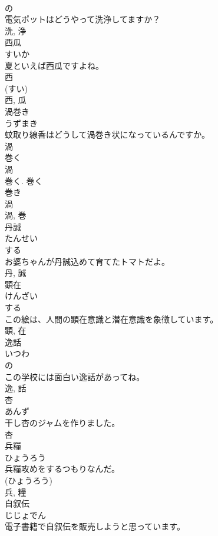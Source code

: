 \documentclass[8pt]{extreport}
\begin{document}
\begin{CJK}{UTF8}{min}
\\	の 
\\	電気ポットはどうやって洗浄してますか？	
\\	洗, 浄	
\\	西瓜	
\\	すいか	
\\	夏といえば西瓜ですよね。	
\\	西 
\\	(すい) 
\\	西, 瓜	
\\	渦巻き	
\\	うずまき	
\\	蚊取り線香はどうして渦巻き状になっているんですか。	
\\	渦 
\\	巻く 
\\	渦 
\\	巻く. 巻く 
\\	巻き 
\\	渦 
\\	渦, 巻	
\\	丹誠	
\\	たんせい	
\\	する 
\\	お婆ちゃんが丹誠込めて育てたトマトだよ。	
\\	丹, 誠	
\\	顕在	
\\	けんざい	
\\	する 
\\	この絵は、人間の顕在意識と潜在意識を象徴しています。	
\\	顕, 在	
\\	逸話	
\\	いつわ	
\\	の 
\\	この学校には面白い逸話があってね。	
\\	逸, 話	
\\	杏	
\\	あんず	
\\	干し杏のジャムを作りました。	
\\	杏	
\\	兵糧	
\\	ひょうろう	
\\	兵糧攻めをするつもりなんだ。	
\\	(ひょうろう) 
\\	兵, 糧	
\\	自叙伝	
\\	じじょでん	
\\	電子書籍で自叙伝を販売しようと思っています。	

\end{CJK}
\end{document}
